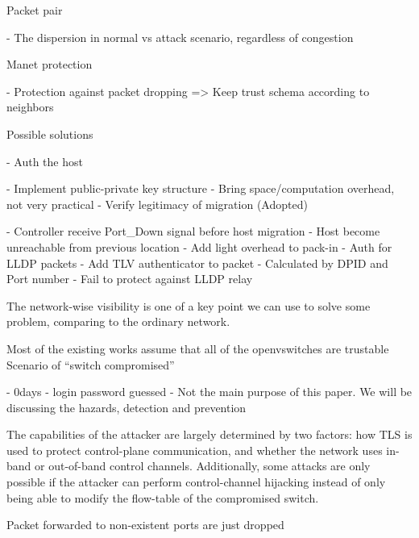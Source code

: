 Packet pair

- The dispersion in normal vs attack scenario, regardless of congestion


Manet protection

- Protection against packet dropping => Keep trust schema according to neighbors

Possible solutions

- Auth the host

    - Implement public-private key structure
    - Bring space/computation overhead, not very practical
- Verify legitimacy of migration (Adopted)

    - Controller receive Port\_Down signal before host migration
    - Host become unreachable from previous location
    - Add light overhead to pack-in
- Auth for LLDP packets
    - Add TLV authenticator to packet
    - Calculated by DPID and Port number
    - Fail to protect against LLDP relay


The network-wise visibility is one of a key point we can use to solve some problem, comparing to the ordinary network.

Most of the existing works assume that all of the openvswitches are trustable Scenario of “switch compromised”

- 0days
- login password guessed
- Not the main purpose of this paper. We will be discussing the hazards, detection and prevention

The capabilities of the attacker are largely determined by two
factors: how TLS is used to protect control-plane communication, and whether
the network uses in-band or out-of-band control channels. Additionally, some
attacks are only possible if the attacker can perform control-channel hijacking
instead of only being able to modify the flow-table of the compromised switch.

Packet forwarded to non-existent ports are just dropped

